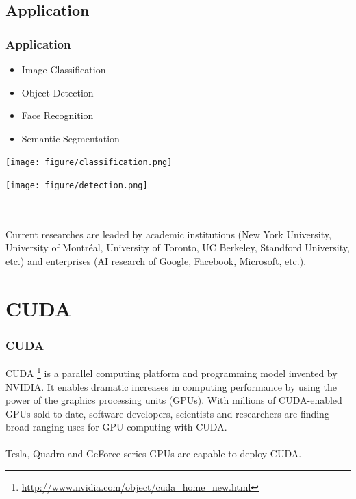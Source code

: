 \documentclass[10pt, mathserif]{beamer}	%
\newcommand{\ftitle}[1]{\frametitle{\hspace{4ex} {#1}}}	%
\begin{document}
\begin{CJK}{UTF8}{song}
\subsection{Application}
\begin{frame}
	\ftitle{Application}
	\begin{itemize}
		\item Image Classification \cite{ILSVRC15}
		\item Object Detection \cite{girshick2015fast}
		\item Face Recognition \cite{Sun_2014_CVPR}
		\item Semantic Segmentation \cite{long2015fully} 
	\end{itemize}
	\begin{minipage}{0.45\textwidth}
		\centering
		\texttt{[image: figure/classification.png]}
	\end{minipage}
	\hfill
	\begin{minipage}{0.45\textwidth}
		\centering
		\texttt{[image: figure/detection.png]}
	\end{minipage}\\
	~\\
	Current researches are leaded by academic institutions (New York University, University of Montréal, University of Toronto, UC Berkeley, Standford University, etc.) and enterprises (AI research of Google, Facebook, Microsoft, etc.).
\end{frame}

\section{CUDA}
\begin{frame}
	\ftitle{CUDA}
	CUDA \footnote{\url{http://www.nvidia.com/object/cuda_home_new.html}} is a parallel computing platform and programming model invented by NVIDIA. It enables dramatic increases in computing performance by using the power of the graphics processing units (GPUs). With millions of CUDA-enabled GPUs sold to date, software developers, scientists and researchers are finding broad-ranging uses for GPU computing with CUDA. \\
	~\\
	Tesla, Quadro and GeForce series GPUs are capable to deploy CUDA.
\end{frame}


\end{CJK}
\end{document}
